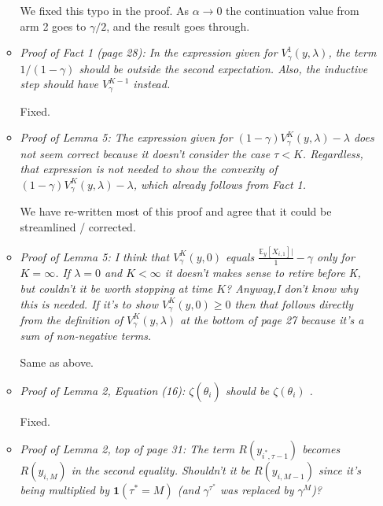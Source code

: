 \documentclass[11pt]{article}
\newcommand{\1}{\ensuremath{\mathbf{1}}} %
\theoremstyle{thm-sf}
\begin{document}
\begin{enumerate}
\begin{itemize}
			 We fixed this typo in the proof. As $\alpha \to 0$ the continuation value from arm 2 goes to $\gamma/2$, and the result goes through.
			 
			 \item {\it Proof of Fact 1 (page 28): In the expression given for $V^1_\gamma(y, \lambda)$, the term $1/(1-\gamma)$ should be outside the second expectation. Also, the inductive step should have $V^{K-1}_\gamma$ instead.}
			 
			 Fixed.
			 
			 \item {\it Proof of Lemma 5: The expression given for $(1 - \gamma) V_\gamma^K (y, \lambda) - \lambda$ does not seem correct because it doesn't consider the case $\tau < K$. Regardless, that expression is not needed to show the convexity of $(1 - \gamma) V_\gamma^K (y, \lambda) - \lambda$, which already follows from Fact 1.}
			 
			 We have re-written most of this proof and agree that it could be streamlined / corrected.
			 
			 \item {\it Proof of Lemma 5: I think that $V^{K}_\gamma(y, 0)$ equals $\frac{\mathbb E_y[X_{i,1}]|}1-\gamma$ only for $K = \infty$. If $\lambda = 0$ and $K < \infty$ it doesn't makes sense to retire before K, but couldn't it be worth stopping at time $K$? Anyway,I don't know why this is needed. If it's to show $V^{K}_\gamma(y, 0) \geq 0$ then that follows directly from the definition of $V^{K}_\gamma(y, \lambda)$ at the bottom of page 27 because it's a sum of non-negative terms.}
			 
			 Same as above.
			 
			 \item {\it Proof of Lemma 2, Equation (16): $\zeta(\hat \theta_i)$ should be $\zeta(\theta_i)$ .}
			 
			 Fixed.
			 
			 \item {\it 
			 	Proof of Lemma 2, top of page 31: The term  $R(y_{i^*, \tau - 1})$ becomes $R(y_{i,M})$ in the second equality. Shouldn't it be $R(y_{i,M-1})$ since it's being multiplied by $\mathbf 1(\tau^* = M)$ (and $\gamma^{\tau^*}$ was replaced by $\gamma^M$)?
			 }
			 

\end{itemize}
\end{enumerate}
\end{document}
